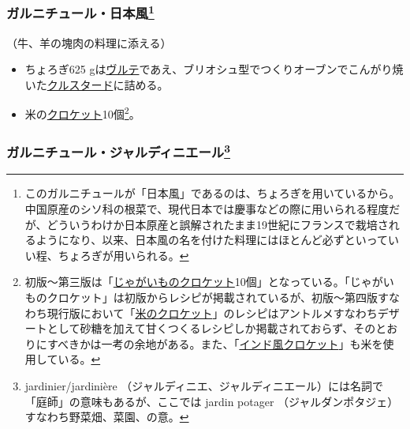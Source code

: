 \begin{recette}
\hypertarget{garniture-a-la-japonaise}{%
\subsubsection[ガルニチュール・日本風]{\texorpdfstring{ガルニチュール・日本風\footnote{このガルニチュールが「日本風」であるのは、ちょろぎを用いているから。中国原産のシソ科の根菜で、現代日本では慶事などの際に用いられる程度だが、どういうわけか日本原産と誤解されたまま19世紀にフランスで栽培されるようになり、以来、日本風の名を付けた料理にはほとんど必ずといっていい程、ちょろぎが用いられる。}}{ガルニチュール・日本風}}\label{garniture-a-la-japonaise}}



（牛、羊の塊肉の料理に添える）

\begin{itemize}
\item
  ちょろぎ625
  gは\protect\hyperlink{veloute}{ヴルテ}であえ、ブリオシュ型でつくりオーブンでこんがり焼いた\protect\hyperlink{croustades}{クルスタード}に詰める。
\item
  米の\protect\hyperlink{croquettes}{クロケット}10個\footnote{初版〜第三版は「\protect\hyperlink{croquettes-de-pommes-de-terre}{じゃがいものクロケット}10個」となっている。「じゃがいものクロケット」は初版からレシピが掲載されているが、初版〜第四版すなわち現行版において「\href{Ecroquettes-de-riz}{米のクロケット}」のレシピはアントルメすなわちデザートとして砂糖を加えて甘くつくるレシピしか掲載されておらず、そのとおりにすべきかは一考の余地がある。また、「\protect\hyperlink{croquettes-a-l-indienne}{インド風クロケット}」も米を使用している。}。
\end{itemize}

\hypertarget{garniture-a-la-jardiniere}{%
\subsubsection[ガルニチュール・ジャルディニエール]{\texorpdfstring{ガルニチュール・ジャルディニエール\footnote{jardinier/jardinière
  （ジャルディニエ、ジャルディニエール）には名詞で「庭師」の意味もあるが、ここでは
  jardin potager （ジャルダンポタジェ）すなわち野菜畑、菜園、の意。}}{ガルニチュール・ジャルディニエール}}\label{garniture-a-la-jardiniere}}


\end{recette}

